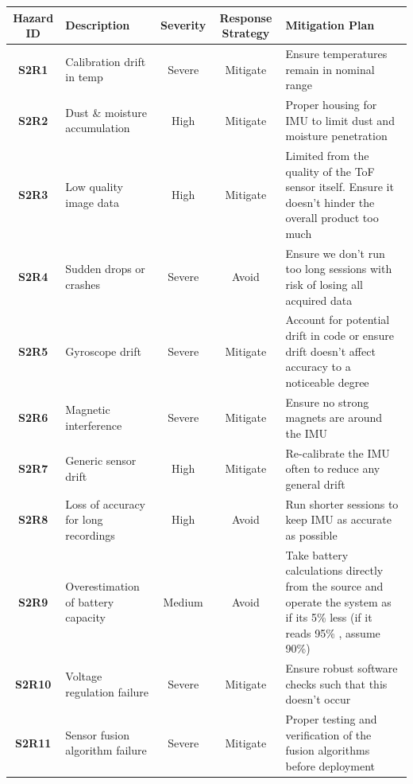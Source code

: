 \documentclass[11pt]{article}
\begin{document}
			\begin{tabularx}{\textwidth}{ c  p{}  c  c  X }
				\toprule
				\textbf{Hazard ID} & \textbf{Description} & \textbf{Severity} & \textbf{Response Strategy} & \textbf {Mitigation Plan} \\ 
				\hline 
                \textbf{S2R1} & Calibration drift in temp & Severe & Mitigate & Ensure temperatures remain in nominal range \\
                \hline
                \textbf{S2R2} & Dust \& moisture accumulation & High & Mitigate & Proper housing for IMU to limit dust and moisture penetration \\
                \hline
                \textbf{S2R3} & Low quality image data & High & Mitigate & Limited from the quality of the ToF sensor itself. Ensure it doesn't hinder the overall product too much \\
                \hline
                \textbf{S2R4} & Sudden drops or crashes & Severe & Avoid & Ensure we don't run too long sessions with risk of losing all acquired data \\
                \hline
                \textbf{S2R5} & Gyroscope drift & Severe & Mitigate & Account for potential drift in code or ensure drift doesn't affect accuracy to a noticeable degree \\
                \hline
                \textbf{S2R6} & Magnetic interference & Severe & Mitigate & Ensure no strong magnets are around the IMU \\
                \hline
                \textbf{S2R7} & Generic sensor drift & High & Mitigate & Re-calibrate the IMU often to reduce any general drift  \\
                \hline
                \textbf{S2R8} & Loss of accuracy for long recordings & High & Avoid & Run shorter sessions to keep IMU as accurate as possible \\
                \hline
                \textbf{S2R9} & Overestimation of battery capacity & Medium & Avoid & Take battery calculations directly from the source and operate the system as if its 5\% less (if it reads 95\% , assume 90\%) \\
                \hline
                \textbf{S2R10} & Voltage regulation failure & Severe & Mitigate & Ensure robust software checks such that this doesn't occur \\
                \hline
                \textbf{S2R11} & Sensor fusion algorithm failure & Severe & Mitigate & Proper testing and verification of the fusion algorithms before deployment \\

\end{tabularx}
\end{document}

